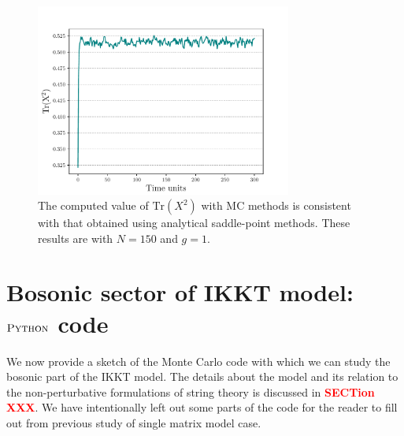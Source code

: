 \documentclass[11pt]{article}
\newcommand{\TODO}[1]{\textcolor{red}{{\bf #1}}}
\begin{document}
\begin{footnotesize} 
\begin{mdframed}[backgroundcolor=magenta!2] 

\end{mdframed} 
	\end{footnotesize} 
	
\begin{figure}[htbp] 
\centering 
\includegraphics[width=0.75\textwidth]{figs/mm_plot.pdf}
\caption{\label{fig:F_app1}The computed value of $\mbox{Tr}(X^2)$ with MC methods is consistent with that obtained using analytical saddle-point methods. These results are with $N=150$ and $g=1$.}
\end{figure}

\section{Bosonic sector of IKKT model: $\textsc{Python}$ code}

We now provide a sketch of the Monte Carlo code with which we can study the bosonic
part of the IKKT model. The details about the model and its relation to the non-perturbative formulations of string theory is discussed in \TODO{SECTion XXX}. 
We have intentionally left out some parts of the code for the reader to fill out from previous study of single matrix model case.  

\begin{footnotesize} 
	\begin{mdframed}[backgroundcolor=magenta!2] 
			
	\end{mdframed} 
\end{footnotesize}

\end{document}
